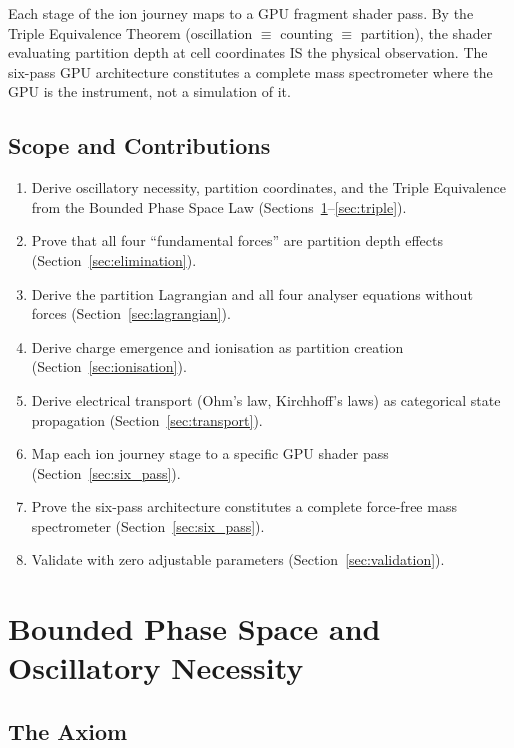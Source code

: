\documentclass[11pt,twocolumn,a4paper]{article}
\theoremstyle{definition}
\theoremstyle{remark}
\begin{document}
Each stage of the ion journey maps to a GPU fragment shader pass. By the Triple Equivalence Theorem (oscillation $\equiv$ counting $\equiv$ partition), the shader evaluating partition depth at cell coordinates IS the physical observation. The six-pass GPU architecture constitutes a complete mass spectrometer where the GPU is the instrument, not a simulation of it.

\subsection{Scope and Contributions}

\begin{enumerate}[nosep]
\item Derive oscillatory necessity, partition coordinates, and the Triple Equivalence from the Bounded Phase Space Law (Sections~\ref{sec:foundations}--\ref{sec:triple}).
\item Prove that all four ``fundamental forces'' are partition depth effects (Section~\ref{sec:elimination}).
\item Derive the partition Lagrangian and all four analyser equations without forces (Section~\ref{sec:lagrangian}).
\item Derive charge emergence and ionisation as partition creation (Section~\ref{sec:ionisation}).
\item Derive electrical transport (Ohm's law, Kirchhoff's laws) as categorical state propagation (Section~\ref{sec:transport}).
\item Map each ion journey stage to a specific GPU shader pass (Section~\ref{sec:six_pass}).
\item Prove the six-pass architecture constitutes a complete force-free mass spectrometer (Section~\ref{sec:six_pass}).
\item Validate with zero adjustable parameters (Section~\ref{sec:validation}).
\end{enumerate}

\section{Bounded Phase Space and Oscillatory Necessity}
\label{sec:foundations}

\subsection{The Axiom}
\end{document}

